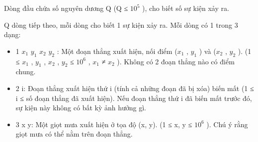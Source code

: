 Dòng đầu chứa số nguyên dương Q (Q ≤ $10^{5}$ ), cho biết số sự kiện xảy ra.

Q dòng tiếp theo, mỗi dòng cho biết 1 sự kiện xảy ra. Mỗi dòng có 1 trong 3 dạng:
\begin{itemize}
	\item 1 $x_{1}$ $y_{1}$ $x_{2}$ $y_{2}$ : Một đoạn thẳng xuất hiện, nối điểm ($x_{1}$ , $y_{1}$ ) và ($x_{2}$ , $y_{2}$ ). (1 ≤ $x_{1}$ , $y_{1}$ , $x_{2}$ , $y_{2}$ ≤ $10^{6}$ , $x_{1}$ ≠ $x_{2}$ ). Không có 2 đoạn thẳng nào có điểm chung.
	\item 2 i: Đoạn thẳng xuất hiện thứ i (tính cả những đoạn đã bị xóa) biến mất (1 ≤ i ≤ số đoạn thẳng đã xuất hiện). Nếu đoạn thẳng thứ i đã biến mất trước đó, sự kiện này không có bất kỳ ảnh hưởng gì.
	\item 3 x y: Một giọt mưa xuất hiện ở tọa độ (x, y). (1 ≤ x, y ≤ $10^{6}$ ). Chú ý rằng giọt mưa có thể nằm trên đoạn thẳng.
\end{itemize}